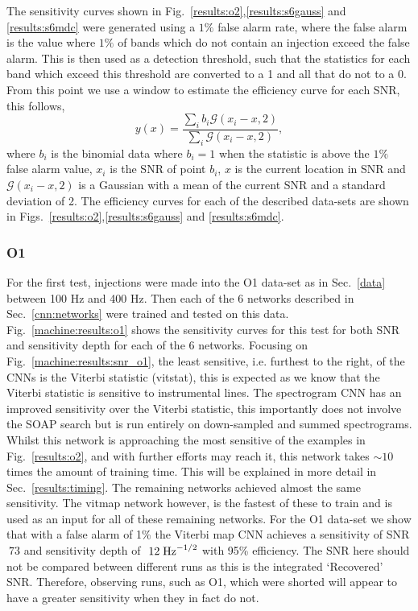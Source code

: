 The sensitivity curves shown in Fig.~\ref{results:o2},\ref{results:s6gauss} and \ref{results:s6mdc} were generated using a $1\%$ false alarm rate, where the false alarm is the value where $1\%$ of bands which do not contain an injection exceed the false alarm. 
This is then used as a detection threshold, such that the statistics for each band which exceed this threshold are converted to a 1 and all that do not to a 0.
From this point we use a window to estimate the efficiency curve for each \ac{SNR}, this follows,
\begin{equation}
y(x) = \frac{\sum_i b_i \mathcal{G}(x_i - x,2)}{\sum_i \mathcal{G}(x_i - x,2)},
\end{equation}
where $b_i$ is the binomial data where $b_i=1$ when the statistic is above the $1\%$ false alarm value, $x_i$ is the \ac{SNR} of point $b_i$, $x$ is the current location in \ac{SNR} and $\mathcal{G}(x_i - x,2)$ is a Gaussian with a mean of the current \ac{SNR} and a standard deviation of 2.
The efficiency curves for each of the described data-sets are shown in Figs.~\ref{results:o2},\ref{results:s6gauss} and \ref{results:s6mdc}.


\subsubsection{O1}

For the first test, injections were made into the O1 data-set as in Sec.~\ref{data} between 100 Hz and 400 Hz. Then each of the 6 networks described in Sec.~\ref{cnn:networks} were trained and tested on this data. 
Fig.~\ref{machine:results:o1} shows the sensitivity curves for this test for both \ac{SNR} and sensitivity depth for each of the 6 networks. Focusing on Fig.~\ref{machine:results:snr_o1}, the least sensitive, i.e. furthest to the right, of the \acp{CNN} is the Viterbi statistic (vitstat), this is expected as we know that the Viterbi statistic is sensitive to instrumental lines. 
The spectrogram \ac{CNN} has an improved sensitivity over the Viterbi statistic, this importantly does not involve the SOAP search but is run entirely on down-sampled and summed spectrograms. 
Whilst this network is approaching the most sensitive of the examples in Fig.~\ref{results:o2}, and with further efforts may reach it, this network takes $\sim10$ times the amount of training time. This will be explained in more detail in Sec.~\ref{results:timing}.
The remaining networks achieved almost the same sensitivity. 
The vitmap network however, is the fastest of these to train and is used as an input for all of these remaining networks.
For the O1 data-set we show that with a false alarm of 1\% the Viterbi map \ac{CNN} achieves a sensitivity of SNR $~73$ and sensitivity depth of $~12\; {\rm Hz}^{-1/2}$ with 95\% efficiency.
The \ac{SNR} here should not be compared between different runs as this is the integrated `Recovered' \ac{SNR}. Therefore, observing runs, such as O1, which were shorted will appear to have a greater sensitivity when they in fact do not. 

